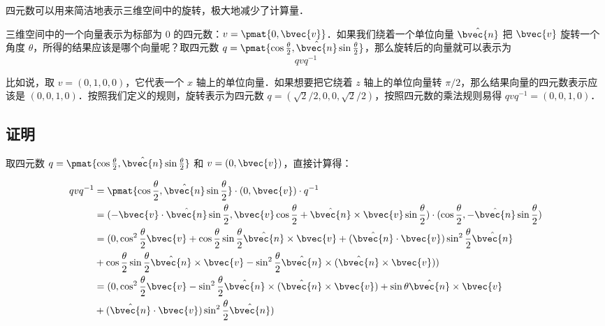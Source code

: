 
\begin{issues}
\issueAbstract
\issueTODO
\end{issues}


四元数可以用来简洁地表示三维空间中的旋转，极大地减少了计算量．

三维空间中的一个向量表示为标部为 $0$ 的四元数：$v=\pmat{0, \bvec{v}}$．如果我们绕着一个单位向量 $\hat{\bvec{n}}$ 把 $\bvec{v}$ 旋转一个角度 $\theta$，所得的结果应该是哪个向量呢？取四元数 $q=\pmat{\cos{\frac{\theta}{2}}, \hat{\bvec{n}}\sin{\frac{\theta}{2}}}$，那么旋转后的向量就可以表示为
\begin{equation}
qvq^{-1}
\end{equation}

比如说，取 $v=(0, 1, 0, 0)$，它代表一个 $x$ 轴上的单位向量．如果想要把它绕着 $z$ 轴上的单位向量转 $\pi/2$，那么结果向量的四元数表示应该是 $(0, 0, 1, 0)$．按照我们定义的规则，旋转表示为四元数 $q=(\sqrt{2}/2, 0, 0, \sqrt{2}/2)$，按照四元数的乘法规则易得 $qvq^{-1}=(0,0,1,0)$．

\subsection{证明}

取四元数 $q=\pmat{\cos{\frac{\theta}{2}}, \hat{\bvec{n}}\sin{\frac{\theta}{2}}}$ 和 $v=(0, \bvec{v})$，直接计算得：

\begin{equation}
\begin{aligned}
qvq^{-1}&=\pmat{\cos{\frac{\theta}{2}}, \hat{\bvec{n}}\sin{\frac{\theta}{2}}}\cdot (0, \bvec{v})\cdot q^{-1}\\&
=(-\bvec{v}\cdot\hat{\bvec{n}}\sin{\frac{\theta}{2}}, \bvec{v}\cos{\frac{\theta}{2}}+\hat{\bvec{n}}\times\bvec{v}\sin{\frac{\theta}{2}})\cdot (\cos{\frac{\theta}{2}}, -\hat{\bvec{n}}\sin{\frac{\theta}{2}})\\&
=(0, \cos^2\frac{\theta}{2}\bvec{v}+\cos\frac{\theta}{2}\sin\frac{\theta}{2}\hat{\bvec{n}}\times\bvec{v}+(\hat{\bvec{n}}\cdot\bvec{v})\sin^2\frac{\theta}{2}\hat{\bvec{n}}\\&+\cos\frac{\theta}{2}\sin\frac{\theta}{2}\hat{\bvec{n}}\times\bvec{v}-\sin^2\frac{\theta}{2}\hat{\bvec{n}}\times(\hat{\bvec{n}}\times\bvec{v}))\\&
=(0, \cos^2\frac{\theta}{2}\bvec{v}-\sin^2\frac{\theta}{2}\hat{\bvec{n}}\times(\hat{\bvec{n}}\times\bvec{v})+\sin\theta\hat{\bvec{n}}\times\bvec{v}\\&+(\hat{\bvec{n}}\cdot\bvec{v})\sin^2\frac{\theta}{2}\hat{\bvec{n}})
\end{aligned}
\end{equation}

